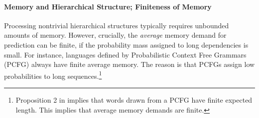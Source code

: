 \paragraph{Memory and Hierarchical Structure; Finiteness of Memory}
Processing nontrivial hierarchical structures typically requires unbounded amounts of memory.
However, crucially, the \emph{average} memory demand for prediction can be finite, if the probability mass assigned to long dependencies is small.
For instance, languages defined by Probabilistic Context Free Grammars (PCFG) always have finite average memory.
The reason is that PCFGs assign low probabilities to long sequences.\footnote{Proposition 2 in \cite{chi-statistical-1999} implies that words drawn from a PCFG have finite expected length. This implies that average memory demands are finite.}









